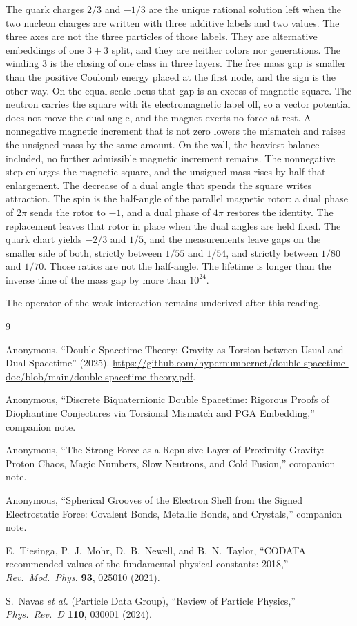 \documentclass[a4paper]{article}
\begin{document}
The quark charges \(2/3\) and \(-1/3\) are the unique rational solution left when the two nucleon charges are written with three additive labels and two values. The three axes are not the three particles of those labels. They are alternative embeddings of one \(3+3\) split, and they are neither colors nor generations. The winding \(3\) is the closing of one class in three layers. The free mass gap is smaller than the positive Coulomb energy placed at the first node, and the sign is the other way. On the equal-scale locus that gap is an excess of magnetic square. The neutron carries the square with its electromagnetic label off, so a vector potential does not move the dual angle, and the magnet exerts no force at rest. A nonnegative magnetic increment that is not zero lowers the mismatch and raises the unsigned mass by the same amount. On the wall, the heaviest balance included, no further admissible magnetic increment remains. The nonnegative step enlarges the magnetic square, and the unsigned mass rises by half that enlargement. The decrease of a dual angle that spends the square writes attraction. The spin is the half-angle of the parallel magnetic rotor: a dual phase of \(2\pi\) sends the rotor to \(-1\), and a dual phase of \(4\pi\) restores the identity. The replacement leaves that rotor in place when the dual angles are held fixed. The quark chart yields \(-2/3\) and \(1/5\), and the measurements leave gaps on the smaller side of both, strictly between \(1/55\) and \(1/54\), and strictly between \(1/80\) and \(1/70\). Those ratios are not the half-angle. The lifetime is longer than the inverse time of the mass gap by more than \(10^{24}\).

The operator of the weak interaction remains underived after this reading.

\begin{thebibliography}{9}
\raggedright

Anonymous,
``Double Spacetime Theory: Gravity as Torsion between Usual and Dual Spacetime'' (2025).
\url{https://github.com/hypernumbernet/double-spacetime-doc/blob/main/double-spacetime-theory.pdf}.

Anonymous,
``Discrete Biquaternionic Double Spacetime: Rigorous Proofs of Diophantine Conjectures via Torsional Mismatch and PGA Embedding,''
companion note.

Anonymous,
``The Strong Force as a Repulsive Layer of Proximity Gravity: Proton Chaos, Magic Numbers, Slow Neutrons, and Cold Fusion,''
companion note.

Anonymous,
``Spherical Grooves of the Electron Shell from the Signed Electrostatic Force: Covalent Bonds, Metallic Bonds, and Crystals,''
companion note.

E.~Tiesinga, P.~J.~Mohr, D.~B.~Newell, and B.~N.~Taylor,
``CODATA recommended values of the fundamental physical constants: 2018,''
\textit{Rev.\ Mod.\ Phys.} \textbf{93}, 025010 (2021).

S.~Navas \textit{et al.} (Particle Data Group),
``Review of Particle Physics,''
\textit{Phys.\ Rev.\ D} \textbf{110}, 030001 (2024).

\end{thebibliography}
\end{document}
